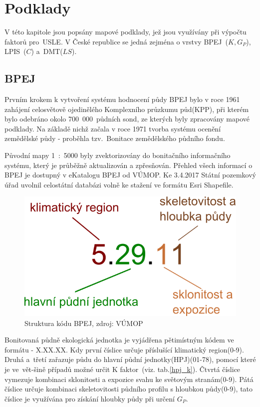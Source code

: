 \chapter{Podklady}
V této kapitole jsou popsány mapové podklady, jež jsou využívány při výpočtu 
faktorů \hbox{pro~USLE}. V České republice se jedná zejména o vrstvy 
BPEJ~($K, G_P$), LPIS~($C$) a~DMT($LS$).
\section{BPEJ}
\label{3-bpej}
Prvním krokem k vytvoření systému hodnocení půdy BPEJ bylo v roce 1961
zahájení celosvětově ojedinělého Komplexního průzkumu půd(KPP), při
kterém bylo odebráno okolo 700~000~půdních sond, ze kterých byly
zpracovány mapové podklady. Na základě nichž začala v roce 1971
tvorba systému ocenění zemědělské půdy - proběhla tzv.~Bonitace
zemědělského půdního fondu.

Původní mapy 1~:~5000 byly zvektorizovány do bonitačního informačního
systému, který je průběžně aktualizován a zpřesňován. Přehled všech
informací o BPEJ je dostupný v eKatalogu BPEJ od
VÚMOP\cite{bpej_vumop}. Ke 3.4.2017 Státní pozemkový úřad uvolnil
celostátní databázi volně ke stažení ve formátu Esri Shapefile\cite{spucr}.
\begin{figure}[H]
    \centering
    \includegraphics[scale=0.5]{./pictures/Struktura_BPEJ.png}
      \caption[Struktura kódu BPEJ]{Struktura kódu BPEJ, zdroj:
        VÚMOP\cite{bpej_vumop}}
      \label{fig:struktura_bpej}
\end{figure}
Bonitovaná půdně ekologická jednotka je vyjádřena pětimístným kódem ve
formátu - X.XX.XX. Kdy první číslice určuje příslušící klimatický
region(0-9). Druhá a~třetí zařazuje půdu do hlavní půdní
jednotky(HPJ)(01-78), pomocí které je ve~vět-šině případů možné určit K
faktor~(viz. tab.\ref{hpj_k}). Čtvrtá číslice vymezuje kombinaci
sklonitosti a expozice svahu ke světovým stranám(0-9). Pátá číslice
určuje kombinaci skeletovitosti půdního profilu s hloubkou půdy(0-9),
tato číslice je využívána pro získání hloubky půdy při určení
$G_P$.\cite{Novotny2013}
